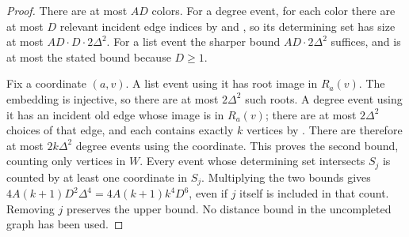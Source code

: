 \begin{proof}
There are at most $AD$ colors. For a degree event, for each color there
are at most $D$ relevant incident edge indices by 
and ,
so its determining set has size at most $AD\cdot D\cdot2\Delta^2$.
For a list event the sharper bound $AD\cdot2\Delta^2$ suffices, and is
at most the stated bound because $D\ge1$.

Fix a coordinate $(a,v)$. A list event using it has root image in
$R_a(v)$. The embedding is injective, so there are at most $2\Delta^2$
such roots. A degree event using it has an incident old edge whose image
is in $R_a(v)$; there are at most $2\Delta^2$ choices of that edge, and
each contains exactly $k$ vertices by .
There are therefore at most $2k\Delta^2$ degree events using the coordinate.
This proves the second bound, counting only vertices in $W$.
Every event whose determining set intersects $S_j$ is counted by at least
one coordinate in $S_j$. Multiplying the two bounds gives
$4A(k+1)D^2\Delta^4=4A(k+1)k^4D^6$, even if $j$ itself is included in
that count. Removing $j$ preserves the upper bound. No distance bound in
the uncompleted graph has been used.
\end{proof}
